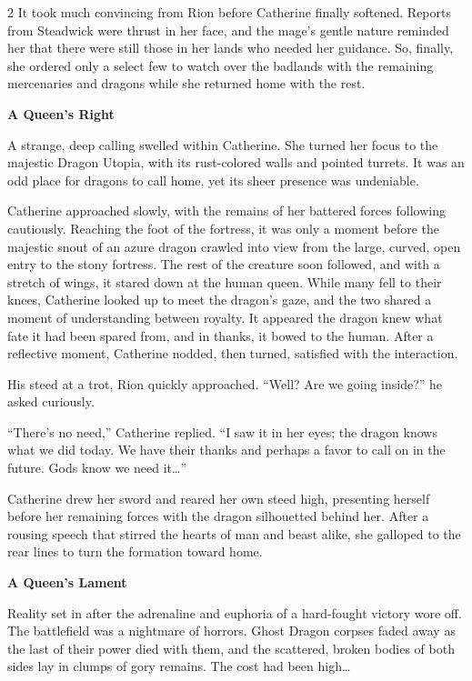 \begin{multicols*}{2}
It took much convincing from Rion before Catherine finally softened.
Reports from Steadwick were thrust in her face, and the mage's gentle nature reminded her that there were still those in her lands who needed her guidance.
So, finally, she ordered only a select few to watch over the badlands with the remaining mercenaries and dragons while she returned home with the rest.

\textbf{A Queen's Right}

A strange, deep calling swelled within Catherine.
She turned her focus to the majestic Dragon Utopia, with its rust-colored walls and pointed turrets.
It was an odd place for dragons to call home, yet its sheer presence was undeniable.

Catherine approached slowly, with the remains of her battered forces following cautiously.
Reaching the foot of the fortress, it was only a moment before the majestic snout of an azure dragon crawled into view from the large, curved, open entry to the stony fortress.
The rest of the creature soon followed, and with a stretch of wings, it stared down at the human queen.
While many fell to their knees, Catherine looked up to meet the dragon's gaze, and the two shared a moment of understanding between royalty.
It appeared the dragon knew what fate it had been spared from, and in thanks, it bowed to the human.
After a reflective moment, Catherine nodded, then turned, satisfied with the interaction.

His steed at a trot, Rion quickly approached.
``Well? Are we going inside?'' he asked curiously.

``There's no need,'' Catherine replied.
``I saw it in her eyes; the dragon knows what we did today.
We have their thanks and perhaps a favor to call on in the future.
Gods know we need it…''

Catherine drew her sword and reared her own steed high, presenting herself before her remaining forces with the dragon silhouetted behind her.
After a rousing speech that stirred the hearts of man and beast alike, she galloped to the rear lines to turn the formation toward home.

\textbf{A Queen's Lament}

Reality set in after the adrenaline and euphoria of a hard-fought victory wore off.
The battlefield was a nightmare of horrors.
Ghost Dragon corpses faded away as the last of their power died with them, and the scattered, broken bodies of both sides lay in clumps of gory remains.
The cost had been high…


\end{multicols*}
